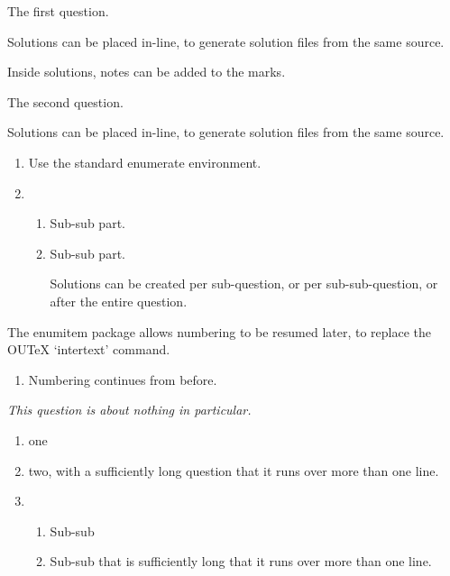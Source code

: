 \documentclass{ouexam}
\begin{document}
\maketitle



The first question.

\begin{solution}
Solutions can be placed in-line, to generate solution files from the same source.

Inside solutions, notes can be added to the marks.
\end{solution}

\question
The second question.

\begin{solution}
Solutions can be placed in-line, to generate solution files from the same source.
\end{solution}


\begin{enumerate}
\item Use the standard enumerate environment.
\item \begin{enumerate}
\item Sub-sub part.
\item Sub-sub part.
\begin{solution}
Solutions can be created per sub-question, or per sub-sub-question, or after the entire question.
\end{solution}
\end{enumerate}
\end{enumerate}
The enumitem package allows numbering to be resumed later, to replace the OUTeX `intertext' command.
\begin{enumerate}[resume]
\item Numbering continues from before.
\end{enumerate}



\question
\emph{This question is about nothing in particular.}
\begin{enumerate}
\item one
\item two, with a sufficiently long question that it runs over more than one line.
\item 
\begin{enumerate}
\item Sub-sub
\item Sub-sub that is sufficiently long that it runs over more than one line.
\end{enumerate}
\end{enumerate}
\end{document}

